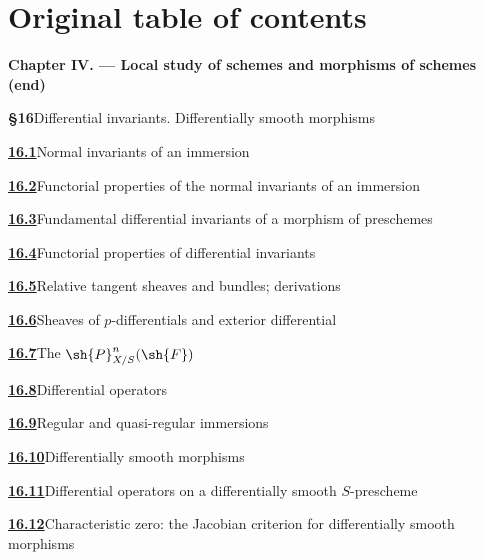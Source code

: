 \clearpage
{}
{}
\section*{Original table of contents}

\begingroup
\small
\newcommand{\EGAIVcontentsline}[3]{%
  \textbf{#1}\quad #2\dotfill #3\par}

\begin{center}\textbf{Chapter IV. --- Local study of schemes and morphisms of schemes (end)}\end{center}

\EGAIVcontentsline{\S16}{Differential invariants. Differentially smooth morphisms}{5}
\EGAIVcontentsline{{\texorpdfstring{\protect\hyperlink{ega4.c04.subsec.16-1}{16.1}}{16.1}}}{Normal invariants of an immersion}{5}
\EGAIVcontentsline{{\texorpdfstring{\protect\hyperlink{ega4.c04.subsec.16-2}{16.2}}{16.2}}}{Functorial properties of the normal invariants of an immersion}{9}
\EGAIVcontentsline{{\texorpdfstring{\protect\hyperlink{ega4.c04.subsec.16-3}{16.3}}{16.3}}}{Fundamental differential invariants of a morphism of preschemes}{14}
\EGAIVcontentsline{{\texorpdfstring{\protect\hyperlink{ega4.c04.subsec.16-4}{16.4}}{16.4}}}{Functorial properties of differential invariants}{16}
\EGAIVcontentsline{{\texorpdfstring{\protect\hyperlink{ega4.c04.subsec.16-5}{16.5}}{16.5}}}{Relative tangent sheaves and bundles; derivations}{27}
\EGAIVcontentsline{{\texorpdfstring{\protect\hyperlink{ega4.c04.subsec.16-6}{16.6}}{16.6}}}{Sheaves of $p$-differentials and exterior differential}{34}
\EGAIVcontentsline{{\texorpdfstring{\protect\hyperlink{ega4.c04.subsec.16-7}{16.7}}{16.7}}}{The $\sh{P}^{n}_{X/S}(\sh{F})$}{36}
\EGAIVcontentsline{{\texorpdfstring{\protect\hyperlink{ega4.c04.subsec.16-8}{16.8}}{16.8}}}{Differential operators}{39}
\EGAIVcontentsline{{\texorpdfstring{\protect\hyperlink{ega4.c04.subsec.16-9}{16.9}}{16.9}}}{Regular and quasi-regular immersions}{46}
\EGAIVcontentsline{{\texorpdfstring{\protect\hyperlink{ega4.c04.subsec.16-10}{16.10}}{16.10}}}{Differentially smooth morphisms}{51}
\EGAIVcontentsline{{\texorpdfstring{\protect\hyperlink{ega4.c04.subsec.16-11}{16.11}}{16.11}}}{Differential operators on a differentially smooth $S$-prescheme}{53}
\EGAIVcontentsline{{\texorpdfstring{\protect\hyperlink{ega4.c04.subsec.16-12}{16.12}}{16.12}}}{Characteristic zero: the Jacobian criterion for differentially smooth morphisms}{55}

